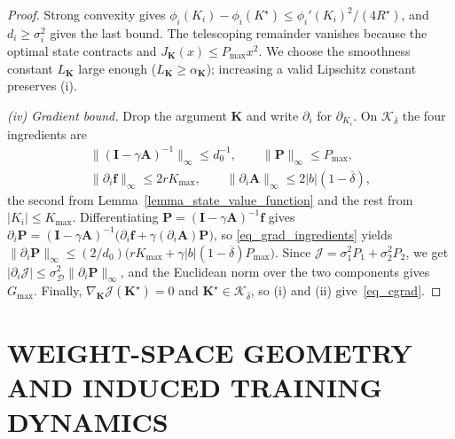 \documentclass[letterpaper, 10 pt, conference]{ieeeconf}
\newcommand{\mbf}{\mathbf{f}}
\newcommand{\bA}{\mathbf{A}}
\newcommand{\bI}{\mathbf{I}}
\newcommand{\bK}{\mathbf{K}}
\newcommand{\bP}{\mathbf{P}}
\newcommand{\cD}{\mathcal{D}}
\newcommand{\cJ}{\mathcal{J}}
\newcommand{\cK}{\mathcal{K}}
\newcommand{\Lemm}{Lemma}
\begin{document}
\begin{proof}
Strong convexity gives $\phi_i(K_i) -\phi_i(K^{\star}) \le \phi_i'(K_i)^2 / (4R^{\star})$, and $d_i\ge\sigma_i^2$ gives the last bound. The telescoping remainder vanishes because the optimal state contracts and $J_{\bK}(x)\le P_{\max}x^2$.  We choose the smoothness constant $L_{\bK}$ large enough ($L_{\bK}\ge\alpha_{\bK}$); increasing a valid Lipschitz constant preserves (i).

\emph{(iv) Gradient bound.} Drop the argument $\bK$ and write $\partial_{i}$ for $\partial_{K_{i}}$. On $\cK_{\overline{\delta}}$ the four ingredients are
\begin{equation} \label{eq_grad_ingredients}
    \begin{gathered}
    \|(\bI{-}\gamma\bA)^{-1}\|_{\infty} \le d_{0}^{-1},
    \qquad
    \|\bP\|_{\infty} \le P_{\max},
    \\
    \|\partial_{i}\mbf\|_{\infty} \le 2rK_{\max},
    \qquad
    \|\partial_{i}\bA\|_{\infty} \le 2|b|(1{-}\overline{\delta}),
    \end{gathered}
\end{equation}
the second from \Lemm~\ref{lemma_state_value_function} and the rest from $|K_{i}| \le K_{\max}$. Differentiating $\bP = (\bI{-}\gamma\bA)^{-1}\mbf$ gives $\partial_{i}\bP = (\bI{-}\gamma\bA)^{-1}\bigl(\partial_{i}\mbf + \gamma(\partial_{i}\bA)\bP\bigr)$, so \eqref{eq_grad_ingredients} yields $\|\partial_{i}\bP\|_{\infty} \le (2/d_{0})\bigl(rK_{\max} + \gamma|b|(1{-}\overline{\delta})P_{\max}\bigr)$. Since $\cJ = \sigma_{1}^{2}P_{1} + \sigma_{2}^{2}P_{2}$, we get $|\partial_{i}\cJ| \le \sigma_{\cD}^{2}\|\partial_{i}\bP\|_{\infty}$, and the Euclidean norm over the two components gives $G_{\max}$. Finally, $\nabla_{\bK}\cJ(\bK^{\star}) {=} 0$ and $\bK^{\star}{\in} \cK_{\overline{\delta}}$, so (i) and (ii) give~\eqref{eq_cgrad}.
\end{proof}

\section{WEIGHT-SPACE GEOMETRY AND INDUCED TRAINING DYNAMICS}
\label{section_weights_level}
\end{document}
